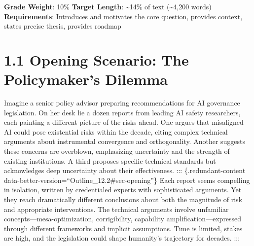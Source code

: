 \documentclass[
  11pt,
  letterpaper,
]{book}
\begin{document}
\begin{tcolorbox}[enhanced jigsaw, arc=.35mm, titlerule=0mm, breakable, toprule=.15mm, toptitle=1mm, colframe=quarto-callout-note-color-frame, coltitle=black, bottomrule=.15mm, bottomtitle=1mm, opacityback=0, title=\textcolor{quarto-callout-note-color}{\faInfo}\hspace{0.5em}{Chapter Overview}, rightrule=.15mm, leftrule=.75mm, colback=white, colbacktitle=quarto-callout-note-color!10!white, opacitybacktitle=0.6, left=2mm]

\textbf{Grade Weight}: 10\% \textbar{} \textbf{Target Length}:
\textasciitilde14\% of text (\textasciitilde4,200 words)\\
\textbf{Requirements}: Introduces and motivates the core question,
provides context, states precise thesis, provides roadmap

\end{tcolorbox}

\section*{1.1 Opening Scenario: The Policymaker's
Dilemma}\label{sec-opening-scenario}


\textcite{todd2024}

Imagine a senior policy advisor preparing recommendations for AI
governance legislation. On her desk lie a dozen reports from leading AI
safety researchers, each painting a different picture of the risks
ahead. One argues that misaligned AI could pose existential risks within
the decade, citing complex technical arguments about instrumental
convergence and orthogonality. Another suggests these concerns are
overblown, emphasizing uncertainty and the strength of existing
institutions. A third proposes specific technical standards but
acknowledges deep uncertainty about their effectiveness. :::
\{.redundant-content
data-better-version=``Outline\_12.2\#sec-opening''\} Each report seems
compelling in isolation, written by credentialed experts with
sophisticated arguments. Yet they reach dramatically different
conclusions about both the magnitude of risk and appropriate
interventions. The technical arguments involve unfamiliar
concepts---mesa-optimization, corrigibility, capability
amplification---expressed through different frameworks and implicit
assumptions. Time is limited, stakes are high, and the legislation could
shape humanity's trajectory for decades. :::
\end{document}
